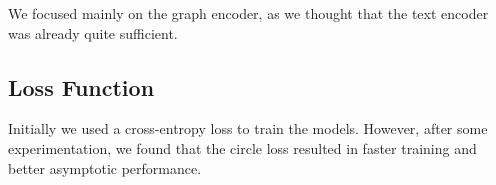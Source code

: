 \documentclass[switch, 11pt]{article}
\begin{document}
\begin{multicols}{2}
    \begin{table}[H]
        \begin{center}
        \end{center}
        \caption{Model evolution throughout the challenge.}
    \end{table}
    \vspace{-7mm}

    We focused mainly on the graph encoder, as we thought that the text encoder was already quite sufficient.

    \subsection{Loss Function}

    Initially we used a cross-entropy loss to train the models. However, after some experimentation, we found that the circle loss \cite{sun-2020} resulted in faster training and better asymptotic performance.


\end{multicols}
\end{document}
